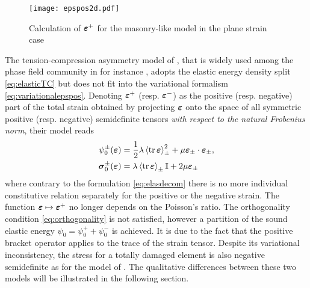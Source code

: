 \begin{figure}[htbp]
\texttt{[image: epspos2d.pdf]}
\caption{Calculation of $\eps^+$ for the masonry-like model \cite{FreddiRoyer-Carfagni:2010} in the plane strain case} \label{fig:epspos2dill}
\end{figure}

The tension-compression asymmetry model of \cite{MieheHofackerWelschinger:2010}, that is widely used among the phase field community in for instance \cite{HofackerMiehe:2012,BordenVerhooselScottHughesLandis:2012,KlinsmannRosatoKamlahMcMeeking:2015,MayVignolletBorst:2015}, adopts the elastic energy density split \eqref{eq:elasticTC} but does not fit into the variational formalism \eqref{eq:variationalepspos}. Denoting $\eps^+$ (resp. $\eps^-$) as the positive (resp. negative) part of the total strain obtained by projecting $\eps$ onto the space of all symmetric positive (resp. negative) semidefinite tensors \emph{with respect to the natural Frobenius norm}, their model reads
\begin{equation} \label{eq:miehe}
\begin{aligned}
\psi_0^\pm(\eps) &= \frac{1}{2}\lambda\inp{\tr\eps}_\pm^2+\mu\eps_\pm\cdot\eps_\pm, \\
\sig_0^\pm(\eps) &= \lambda\inp{\tr\eps}_\pm\mathbb{I}+2\mu\eps_\pm
\end{aligned}
\end{equation}
where contrary to the formulation \eqref{eq:elasdecom} there is no more individual constitutive relation separately for the positive or the negative strain. The function $\eps\mapsto\eps^+$ no longer depends on the Poisson's ratio. The orthogonality condition \eqref{eq:orthogonality} is not satisfied, however a partition of the sound elastic energy $\psi_0=\psi_0^++\psi_0^-$ is achieved. It is due to the fact that the positive bracket operator applies to the trace of the strain tensor. Despite its variational inconsistency, the stress for a totally damaged element is also negative semidefinite as for the model of \cite{FreddiRoyer-Carfagni:2010}. The qualitative differences between these two models will be illustrated in the following section.


